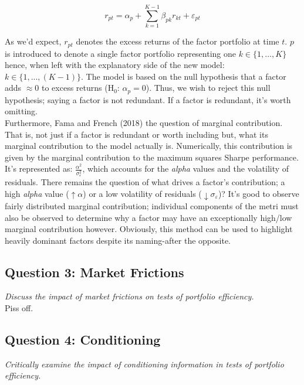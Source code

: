 \documentclass[11pt, english]{article}
\begin{document}
	$$r_{pt}=\alpha_p+\sum_{k=1}^{K-1}\beta_{pk}r_{kt}+\varepsilon_{pt}$$

	As we'd expect, $r_{pt}$ denotes the excess returns of the factor portfolio at time $t$. $p$ is introduced to denote a single factor portfolio representing one $k\in\{1,...,K\}$ hence, when left with the explanatory side of the new model: $k\in\{1,...,(K-1)\}$. The model is based on the null hypothesis that a factor adds $\approx0$ to excess returns (H$_0$: $\alpha_p=0$). Thus, we wish to reject this null hypothesis; saying a factor is not redundant. If a factor is redundant, it's worth omitting.\\

	Furthermore, Fama and French (2018) the question of marginal contribution. That is, not just if a factor is redundant or worth including but, what its marginal contribution to the model actually is. Numerically, this contribution is given by the marginal contribution to the maximum squares Sharpe performance. It's represented as: $\frac{\alpha^2}{\sigma_{\varepsilon}^2}$, which accounts for the \textit{alpha} values and the volatility of residuals. There remains the question of what drives a factor's contribution; a high \textit{alpha} value ($\uparrow\alpha$) or a low volatility of residuals ($\downarrow\sigma_{\varepsilon}$)? It's good to observe fairly distributed marginal contribution; individual components of the metri must also be observed to determine why a factor may have an exceptionally high/low marginal contribution however. Obviously, this method can be used to highlight heavily dominant factors despite its naming-after the opposite.

	\newpage

	\subsection{Question 3: Market Frictions}
              
	\textit{Discuss the impact of market frictions on tests of portfolio efficiency.}\\

	Piss off.

	\newpage

	\subsection{Question 4: Conditioning}

	\textit{Critically examine the impact of conditioning information in tests of portfolio efficiency.}
\end{document}
